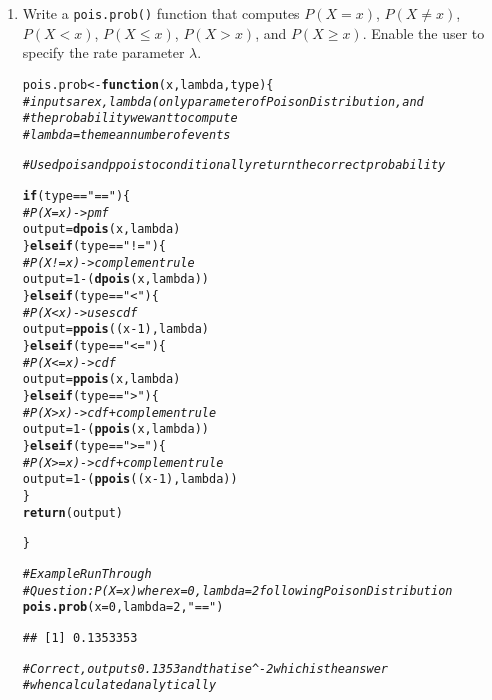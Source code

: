 \documentclass{article}\usepackage[]{graphicx}\usepackage[]{xcolor}
\makeatletter
\newcommand{\hlnum}[1]{\textcolor[rgb]{0.686,0.059,0.569}{#1}}%
\newcommand{\hlsng}[1]{\textcolor[rgb]{0.192,0.494,0.8}{#1}}%
\newcommand{\hlcom}[1]{\textcolor[rgb]{0.678,0.584,0.686}{\textit{#1}}}%
\newcommand{\hlopt}[1]{\textcolor[rgb]{0,0,0}{#1}}%
\newcommand{\hldef}[1]{\textcolor[rgb]{0.345,0.345,0.345}{#1}}%
\newcommand{\hlkwa}[1]{\textcolor[rgb]{0.161,0.373,0.58}{\textbf{#1}}}%
\newcommand{\hlkwb}[1]{\textcolor[rgb]{0.69,0.353,0.396}{#1}}%
\newcommand{\hlkwc}[1]{\textcolor[rgb]{0.333,0.667,0.333}{#1}}%
\newcommand{\hlkwd}[1]{\textcolor[rgb]{0.737,0.353,0.396}{\textbf{#1}}}%
\newenvironment{kframe}{%
 \def\at@end@of@kframe{}%
 \ifinner\ifhmode%
  \def\at@end@of@kframe{\end{minipage}}%
  \begin{minipage}{\columnwidth}%
 \fi\fi%
 \def\FrameCommand##1{\hskip\@totalleftmargin \hskip-\fboxsep
 \colorbox{shadecolor}{##1}\hskip-\fboxsep
     \hskip-\linewidth \hskip-\@totalleftmargin \hskip\columnwidth}%
 \MakeFramed {\advance\hsize-\width
   \@totalleftmargin\z@ \linewidth\hsize
   \@setminipage}}%
 {\par\unskip\endMakeFramed%
 \at@end@of@kframe}
\newenvironment{knitrout}{}{} %
\makeatother
\begin{document}
  \begin{enumerate}
    \item Write a \texttt{pois.prob()} function that computes $P(X=x)$, 
    $P(X \neq x)$, $P(X<x)$, $P(X \leq x)$, $P(X > x)$, and $P(X \geq x).$ Enable the user to specify the rate parameter $\lambda$.
\begin{knitrout}\scriptsize
{}\color{fgcolor}\begin{kframe}
\begin{alltt}
\hldef{pois.prob} \hlkwb{<-} \hlkwa{function}\hldef{(}\hlkwc{x}\hldef{,} \hlkwc{lambda}\hldef{,} \hlkwc{type}\hldef{)\{}
  \hlcom{# inputs are x, lambda (only parameter of Poison Distribution, and }
  \hlcom{#the probability we want to compute}
  \hlcom{# lambda = the mean number of events}

  \hlcom{# Use dpois and ppois to conditionally return the correct probability}

  \hlkwa{if} \hldef{(type} \hlopt{==} \hlsng{"=="}\hldef{)\{}
    \hlcom{# P(X = x) -> pmf}
    \hldef{output} \hlkwb{=} \hlkwd{dpois}\hldef{(x, lambda)}
  \hldef{\}}\hlkwa{else if} \hldef{(type} \hlopt{==} \hlsng{"!="}\hldef{)\{}
    \hlcom{# P(X != x) -> complement rule}
    \hldef{output} \hlkwb{=} \hlnum{1} \hlopt{-} \hldef{(}\hlkwd{dpois}\hldef{(x, lambda))}
  \hldef{\}}\hlkwa{else if} \hldef{(type} \hlopt{==} \hlsng{"<"}\hldef{)\{}
    \hlcom{# P(X < x) -> uses cdf}
    \hldef{output} \hlkwb{=} \hlkwd{ppois}\hldef{((x}\hlopt{-}\hlnum{1}\hldef{), lambda)}
  \hldef{\}}\hlkwa{else if} \hldef{(type} \hlopt{==} \hlsng{"<="}\hldef{)\{}
    \hlcom{# P(X <= x) -> cdf}
    \hldef{output} \hlkwb{=} \hlkwd{ppois}\hldef{(x, lambda)}
  \hldef{\}}\hlkwa{else if} \hldef{(type} \hlopt{==} \hlsng{">"}\hldef{)\{}
    \hlcom{# P(X > x) -> cdf + complement rule}
    \hldef{output} \hlkwb{=} \hlnum{1} \hlopt{-} \hldef{(}\hlkwd{ppois}\hldef{(x, lambda))}
  \hldef{\}}\hlkwa{else if} \hldef{(type} \hlopt{==} \hlsng{">="}\hldef{)\{}
    \hlcom{# P(X >= x) -> cdf + complement rule}
    \hldef{output} \hlkwb{=} \hlnum{1} \hlopt{-} \hldef{(}\hlkwd{ppois}\hldef{((x}\hlopt{-}\hlnum{1}\hldef{), lambda))}
  \hldef{\}}
  \hlkwd{return}\hldef{(output)}

\hldef{\}}

\hlcom{# Example Run Through}
\hlcom{# Question: P( X = x) where x = 0, lambda = 2 following Poison Distribution}
\hlkwd{pois.prob}\hldef{(}\hlkwc{x} \hldef{=} \hlnum{0}\hldef{,} \hlkwc{lambda} \hldef{=} \hlnum{2}\hldef{,}\hlsng{"=="}\hldef{)}
\end{alltt}
\begin{verbatim}
## [1] 0.1353353
\end{verbatim}
\begin{alltt}
\hlcom{# Correct, outputs 0.1353 and that is e^-2 which is the answer}
\hlcom{#when calculated analytically}
\end{alltt}
\end{kframe}
\end{knitrout}


\end{enumerate}
\end{document}
